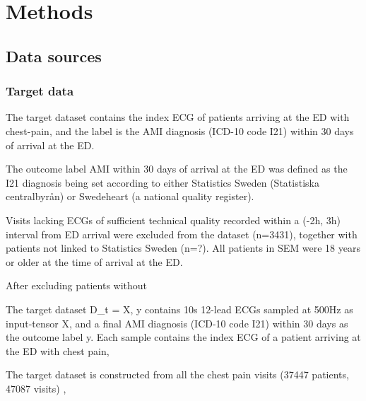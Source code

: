 \documentclass[journal,twoside,web]{ieeecolor}
\begin{document}
\section{Methods}
\subsection{Data sources}

\subsubsection{Target data}
The target dataset contains the index ECG of patients arriving at the ED with chest-pain, and the label is the AMI diagnosis (ICD-10 code I21) within 30 days of arrival at the ED. 

The outcome label AMI within 30 days of arrival at the ED was defined as the I21 diagnosis being set according to either Statistics Sweden (Statistiska centralbyrån) or Swedeheart (a national quality register). 

Visits lacking ECGs of sufficient technical quality recorded within a (-2h, 3h) interval from ED arrival were excluded from the dataset (n=3431), together with patients not linked to Statistics Sweden (n=?). All patients in SEM were 18 years or older at the time of arrival at the ED.

After excluding patients without 

The target dataset D_t = X, y contains 10s 12-lead ECGs sampled at 500Hz as input-tensor X, and a final AMI diagnosis (ICD-10 code I21) within 30 days as the outcome label y. 
Each sample contains the index ECG of a patient arriving at the ED with chest pain, 

The target dataset is constructed from all the chest pain visits (37447 patients, 47087 visits) , 
\end{document}
